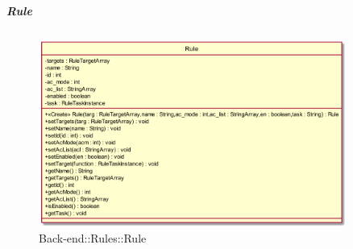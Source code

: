 \hypertarget{Rule_label}{\subparagraph{Rule}}
\begin{figure}[h]
	\centering
	\includegraphics[width=0.90\textwidth,height=\textheight,keepaspectratio]{images/ClassRule.png}
	\caption{Back-end::Rules::Rule}
\end{figure}
